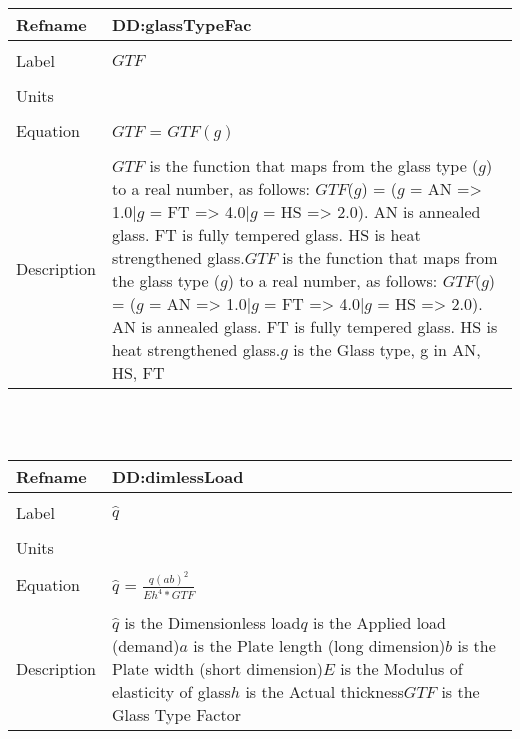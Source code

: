 \documentclass[12pt]{article}
\begin{document}
~\newline
\noindent \begin{minipage}{\textwidth}
\begin{tabular}{p{} p{}}
\toprule \textbf{Refname} & \textbf{DD:glassTypeFac}
\label{DD:glassTypeFac}
\\ \midrule \\
Label & $GTF$
\\ \midrule \\
Units & 
\\ \midrule \\
Equation & $GTF$ = $GTF(g)$
\\ \midrule \\
Description & $GTF$ is the function that maps from the glass type ($g$) to a real number, as follows: $GTF$($g$) = ($g$ = AN => 1.0|$g$ = FT => 4.0|$g$ = HS => 2.0). AN is annealed glass. FT is fully tempered glass. HS is heat strengthened glass.\newline$GTF$ is the function that maps from the glass type ($g$) to a real number, as follows: $GTF$($g$) = ($g$ = AN => 1.0|$g$ = FT => 4.0|$g$ = HS => 2.0). AN is annealed glass. FT is fully tempered glass. HS is heat strengthened glass.\newline$g$ is the Glass type, g in {AN, HS, FT}
\\ \bottomrule \end{tabular}
\end{minipage}\\
~\newline
\noindent \begin{minipage}{\textwidth}
\begin{tabular}{p{} p{}}
\toprule \textbf{Refname} & \textbf{DD:dimlessLoad}
\label{DD:dimlessLoad}
\\ \midrule \\
Label & $\hat{q}$
\\ \midrule \\
Units & 
\\ \midrule \\
Equation & $\hat{q}$ = $\frac{q(ab)^{2}}{Eh^{4}*GTF}$
\\ \midrule \\
Description & $\hat{q}$ is the Dimensionless load\newline$q$ is the Applied load (demand)\newline$a$ is the Plate length (long dimension)\newline$b$ is the Plate width (short dimension)\newline$E$ is the Modulus of elasticity of glass\newline$h$ is the Actual thickness\newline$GTF$ is the Glass Type Factor
\\ \bottomrule \end{tabular}
\end{minipage}\\
\end{document}
